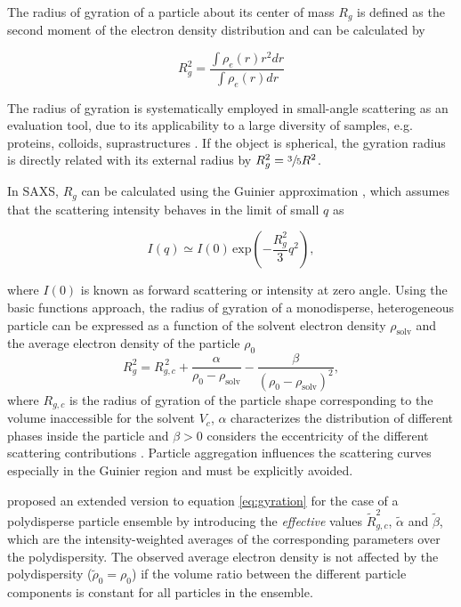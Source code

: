 The radius of gyration of a particle about its center of mass $R_g$ is defined as the second moment of the electron density distribution and can be calculated by 

\begin{equation}
        R_g^2 = \frac{\int \rho_e (r) r^2 dr}{\int \rho_e (r)  dr}
\end{equation}

The radius of gyration is systematically employed in small-angle scattering as an evaluation tool, due to its applicability to a large diversity of samples, e.g. proteins, colloids, suprastructures \citep{mertens_structural_2010,sim_salt_2012}. If the object is spherical, the gyration radius is directly related with its external radius by $R_g^2 = \sfrac{3}{5}R^2$.

In SAXS, $R_g$ can be calculated using the Guinier approximation \citep{guinier_diffraction_1939,guinier_small-angle_1955}, which assumes that the scattering intensity behaves in the limit of small \(q\) as

\begin{equation}
\label{eq:guinier}
I(q) \simeq I(0)\,\mbox{exp}\left(-\frac{R_g^2}{3}q^2\right),
\end{equation}

where \( I(0)\) is known as forward scattering or intensity at zero angle. Using the basic functions approach, the radius of gyration of a monodisperse, heterogeneous particle can be expressed as a function of the solvent electron density \( \rho_{\text{solv}} \) and the average electron density of the particle \( \rho_0 \) \citep{feigin_structure_1987}
\begin{equation}
R_g^2=R_{g,c}^{\,2}+\frac{\alpha}{\rho_0-\rho_{\text{solv}}}-\frac{\beta}{(\rho_0-\rho_{\text{solv}})^2},
\label{eq:gyration}
\end{equation}
where \(R_{g,c}\) is the radius of gyration of the particle shape corresponding to the volume inaccessible for the solvent \( V_c \), \( \alpha \) characterizes the distribution of different phases inside the particle and \( \beta>0 \) considers the eccentricity of the different scattering contributions \citep{stuhrmann_small-angle_2008}. Particle aggregation influences the scattering curves especially in the Guinier region and must be explicitly avoided.

\cite{avdeev_contrast_2007} proposed an extended version to equation \eqref{eq:gyration} for the case of a polydisperse particle ensemble by introducing the \emph{effective} values \( \tilde R^2_{g,c} \), \( \tilde \alpha \) and \( \tilde \beta \), which are the intensity-weighted averages of the corresponding parameters over the polydispersity. The observed average electron density is not affected by the polydispersity (\( \tilde\rho_0=\rho_0 \)) if the volume ratio between the different particle components is constant for all particles in the ensemble.

